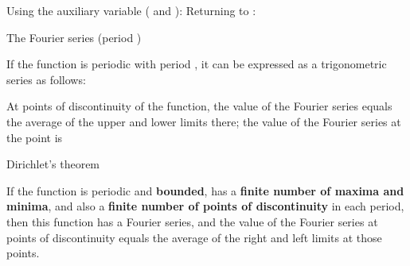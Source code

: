 

Using the auxiliary variable  ( and ):
Returning to :

\begin{EMtheorem}{The Fourier series (period )}

If the function  is periodic with period , it can be expressed as a trigonometric series as follows:

\end{EMtheorem}

\begin{EMremark}{}

At points of discontinuity of the function, the value of the Fourier series equals the average of the upper and lower limits there; the value of the Fourier series at the point  is

\end{EMremark}

\EMhold


\begin{EMtheorem}{Dirichlet's theorem}

If the function  is periodic and \textbf{bounded}, has a \textbf{finite number of maxima and minima}, and also a \textbf{finite number of points of discontinuity} in each period, then this function has a Fourier series, and the value of the Fourier series at points of discontinuity equals the average of the right and left limits at those points.

\end{EMtheorem}

